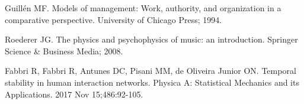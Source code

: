 \documentclass[10pt,letterpaper]{article}
\begin{document}
\begin{thebibliography}{10}
Guill{\'e}n MF.
\newblock Models of management: Work, authority, and organization in a
  comparative perspective.
\newblock University of Chicago Press; 1994.

Roederer JG.
\newblock The physics and psychophysics of music: an introduction.
\newblock Springer Science \& Business Media; 2008.

Fabbri R, Fabbri R, Antunes DC, Pisani MM, de Oliveira Junior ON.
\newblock Temporal stability in human interaction networks.
\newblock Physica A: Statistical Mechanics and its Applications. 2017 Nov 15;486:92-105.

% 
% 
% 
% 
\end{thebibliography}
\end{document}
